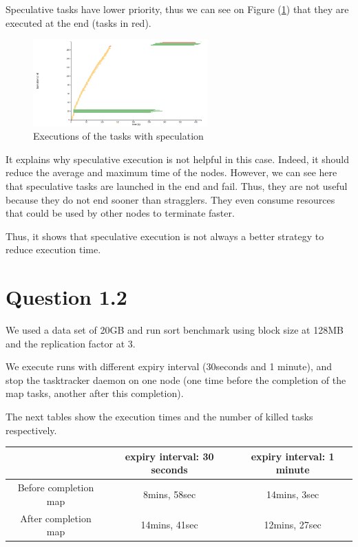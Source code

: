 \documentclass{article}
\begin{document}
Speculative tasks have lower priority, thus we can see on Figure (\ref{spec_prio}) that they are executed at the end (tasks in red).

\begin{figure}%
  \centering
  \includegraphics[width=0.6\textwidth]{spec.png}
  \caption{Executions of the tasks with speculation}
  \label{spec_prio}
\end{figure}


It explains why speculative execution is not helpful in this case. Indeed, it should reduce the average and maximum time of the nodes. However, we can see here that speculative tasks are launched in the end and fail. Thus, they are not useful because they do not end sooner than stragglers. They even consume resources that could be used by other nodes to terminate faster.

Thus, it shows that speculative execution is not always a better strategy to reduce execution time.

\section*{Question 1.2}

We used a data set of 20GB and run sort benchmark using block size at 128MB and the replication factor at 3.

We execute runs with different expiry interval (30seconds and 1 minute), and stop the tasktracker daemon on one node (one time before the completion of the map tasks, another after this completion).

The next tables show the execution times and the number of killed tasks respectively.

\begin{center}
\begin{tabular}{|c|c|c|}
\hline
\ & expiry interval: 30 seconds & expiry interval: 1 minute \\
\hline
Before completion map & 8mins, 58sec & 14mins, 3sec \\
\hline
After completion map & 14mins, 41sec & 12mins, 27sec\\
\hline
\end{tabular}
\end{center}
\end{document}
